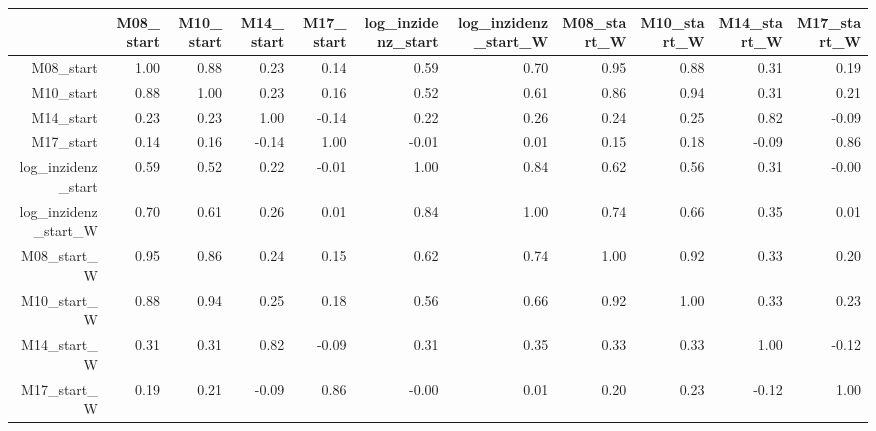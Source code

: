 \documentclass[10pt,a4paper]{article}
\author{Peer Lasse Hinrichsen}
\begin{document}
\begin{landscape}
\begin{table}[ht]
\centering
\begin{tabular}{rrrrrrrrrrr}
  \hline
 & M08\_start & M10\_start & M14\_start & M17\_start & log\_inzidenz\_start & log\_inzidenz\_start\_W & M08\_start\_W & M10\_start\_W & M14\_start\_W & M17\_start\_W \\ 
  \hline
  M08\_start & 1.00 & 0.88 & 0.23 & 0.14 & 0.59 & 0.70 & 0.95 & 0.88 & 0.31 & 0.19 \\ 
  M10\_start & 0.88 & 1.00 & 0.23 & 0.16 & 0.52 & 0.61 & 0.86 & 0.94 & 0.31 & 0.21 \\ 
  M14\_start & 0.23 & 0.23 & 1.00 & -0.14 & 0.22 & 0.26 & 0.24 & 0.25 & 0.82 & -0.09 \\ 
  M17\_start & 0.14 & 0.16 & -0.14 & 1.00 & -0.01 & 0.01 & 0.15 & 0.18 & -0.09 & 0.86 \\ 
  log\_inzidenz\_start & 0.59 & 0.52 & 0.22 & -0.01 & 1.00 & 0.84 & 0.62 & 0.56 & 0.31 & -0.00 \\ 
  log\_inzidenz\_start\_W & 0.70 & 0.61 & 0.26 & 0.01 & 0.84 & 1.00 & 0.74 & 0.66 & 0.35 & 0.01 \\ 
  M08\_start\_W & 0.95 & 0.86 & 0.24 & 0.15 & 0.62 & 0.74 & 1.00 & 0.92 & 0.33 & 0.20 \\ 
  M10\_start\_W & 0.88 & 0.94 & 0.25 & 0.18 & 0.56 & 0.66 & 0.92 & 1.00 & 0.33 & 0.23 \\ 
  M14\_start\_W & 0.31 & 0.31 & 0.82 & -0.09 & 0.31 & 0.35 & 0.33 & 0.33 & 1.00 & -0.12 \\ 
  M17\_start\_W & 0.19 & 0.21 & -0.09 & 0.86 & -0.00 & 0.01 & 0.20 & 0.23 & -0.12 & 1.00 \\ 
   \hline
\end{tabular}
\end{table}
\end{landscape}
\end{document}

